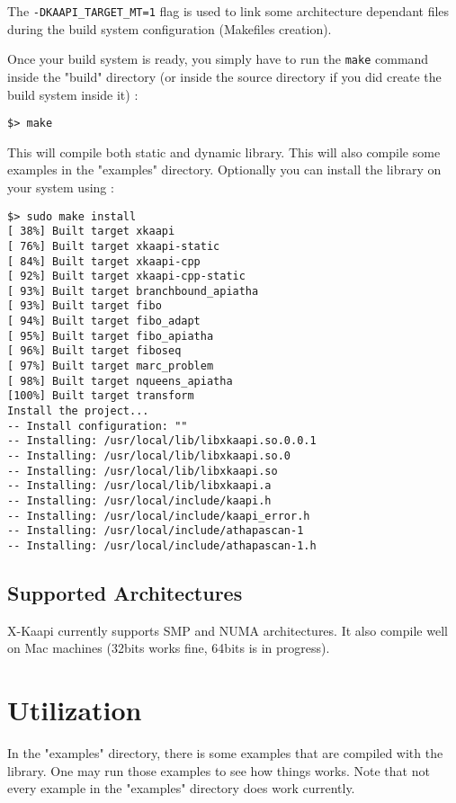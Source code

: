 \documentclass{article}
\newcommand{\kaapi}{\textsc{X}-Kaapi\xspace}
\begin{document}
The \verb+-DKAAPI_TARGET_MT=1+ flag is used to link some architecture dependant files during the build system configuration (Makefiles creation).

Once your build system is ready, you simply have to run the \verb+make+ command inside the "build" directory (or inside the source directory if you did create the build system inside it) :

\begin{verbatim}
$> make
\end{verbatim}

This will compile both static and dynamic library. This will also compile some examples in the "examples" directory.
Optionally you can install the library on your system using :

\begin{verbatim}
$> sudo make install
[ 38%] Built target xkaapi
[ 76%] Built target xkaapi-static
[ 84%] Built target xkaapi-cpp
[ 92%] Built target xkaapi-cpp-static
[ 93%] Built target branchbound_apiatha
[ 93%] Built target fibo
[ 94%] Built target fibo_adapt
[ 95%] Built target fibo_apiatha
[ 96%] Built target fiboseq
[ 97%] Built target marc_problem
[ 98%] Built target nqueens_apiatha
[100%] Built target transform
Install the project...
-- Install configuration: ""
-- Installing: /usr/local/lib/libxkaapi.so.0.0.1
-- Installing: /usr/local/lib/libxkaapi.so.0
-- Installing: /usr/local/lib/libxkaapi.so
-- Installing: /usr/local/lib/libxkaapi.a
-- Installing: /usr/local/include/kaapi.h
-- Installing: /usr/local/include/kaapi_error.h
-- Installing: /usr/local/include/athapascan-1
-- Installing: /usr/local/include/athapascan-1.h
\end{verbatim}

\subsection{Supported Architectures}

\kaapi currently supports SMP and NUMA architectures. It also compile well on Mac machines (32bits works fine, 64bits is in progress).

\section{Utilization}

In the "examples" directory, there is some examples that are compiled with the library. One may run those examples to see how things works.
Note that not every example in the "examples" directory does work currently.
\end{document}
